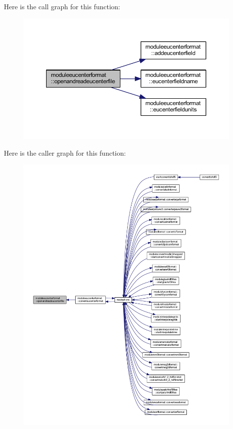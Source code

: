 Here is the call graph for this function\+:\nopagebreak
\begin{figure}[H]
\begin{center}
\leavevmode
\includegraphics[width=350pt]{namespacemoduleeucenterformat_a82e8b7c6bd570b0435fd58801a248e44_cgraph}
\end{center}
\end{figure}
Here is the caller graph for this function\+:\nopagebreak
\begin{figure}[H]
\begin{center}
\leavevmode
\includegraphics[width=350pt]{namespacemoduleeucenterformat_a82e8b7c6bd570b0435fd58801a248e44_icgraph}
\end{center}
\end{figure}
\mbox{\label{namespacemoduleeucenterformat_afb336c51f13a7459800b82f45a13e498}} 
